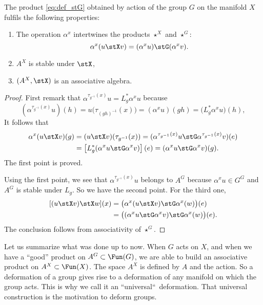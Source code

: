 \begin{theorem}
The product \eqref{eq:def_stG} obtained by action of the group $G$ on the manifold $X$ fulfils the following properties:
\begin{enumerate}
\item\label{itemthostG} The operation $\alpha^x$ intertwines the products $\star^X$ and $\star^G$:
\[
   \alpha^x(u\stX v)=(\alpha^xu)\stG(\alpha^xv).
\]

\item $A^X$ is stable under $\stX$,
\item $(A^X,\stX)$ is an associative algebra.
\end{enumerate}
\end{theorem}


\begin{proof}
First remark that $\alpha^{\tau_{g^{-1}}(x)}u=L^*_g\alpha^xu$ because
\[ 
(\alpha^{\tau_{g^{-1}}(x)}u)(h)=u\big(\tau_{(gh)^{-1}}(x)\big)=(\alpha^xu)(gh)
=\big(L^*_g\alpha^xu\big)(h),
\]
It follows that
\begin{equation}
\begin{split}
\alpha^x(u\stX v)(g)&=(u\stX v)(\tau_{g^{-1}}(x))
                    =(\alpha^{\tau_{g^{-1}}(x)}u\stG\alpha^{\tau_{g^{-1}}(x)}v) (e)\\
            &=\left[ L^*_g(\alpha^xu\stG\alpha^xv) \right](e)
            =(\alpha^xu\stG\alpha^xv)(g).
\end{split}
\end{equation}
The first point is proved.

Using the first point, we see that $\alpha^{\tau_{g^{-1}}(x)}u$ belongs to $A^G$ because $\alpha^xu\in G^G$ and $A^G$ is stable under $L_g$. So we have the second point.  For the third one,
\[ 
\begin{split}
[(u\stX v)\stX w](x)&=\big(\alpha^x(u\stX v)\stG\alpha^x(w)\big)(e)\\
                    &=\big((\alpha^xu\stG\alpha^xv)\stG\alpha^x(w)\big)(e).
\end{split}
\]
The conclusion follows from associativity of $\star^G$.
\end{proof}

Let us summarize what was done up to now. When $G$ acts on $X$, and when we have a ``good'' product on $A^G\subset\Fun(G)$, we are able to build an associative product on $A^X\subset\Fun(X)$. The space $A^X$ is defined by $A$ and the action. So a deformation of a group gives rise to a deformation of any manifold on which the group acts. This is why we call it an ``universal``\ deformation. That universal construction is the motivation to deform groups.

